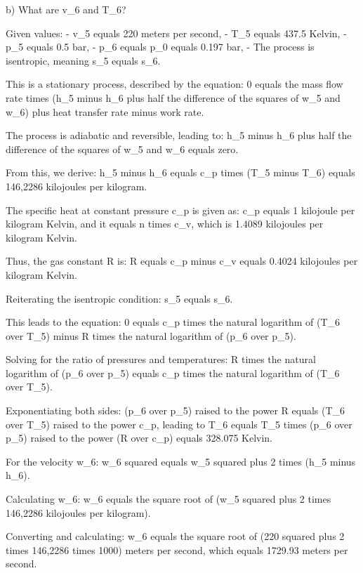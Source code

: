 b) What are v_6 and T_6?

Given values:
- v_5 equals 220 meters per second,
- T_5 equals 437.5 Kelvin,
- p_5 equals 0.5 bar,
- p_6 equals p_0 equals 0.197 bar,
- The process is isentropic, meaning s_5 equals s_6.

This is a stationary process, described by the equation:
0 equals the mass flow rate times (h_5 minus h_6 plus half the difference of the squares of w_5 and w_6) plus heat transfer rate minus work rate.

The process is adiabatic and reversible, leading to:
h_5 minus h_6 plus half the difference of the squares of w_5 and w_6 equals zero.

From this, we derive:
h_5 minus h_6 equals c_p times (T_5 minus T_6) equals 146,2286 kilojoules per kilogram.

The specific heat at constant pressure c_p is given as:
c_p equals 1 kilojoule per kilogram Kelvin, and it equals n times c_v, which is 1.4089 kilojoules per kilogram Kelvin.

Thus, the gas constant R is:
R equals c_p minus c_v equals 0.4024 kilojoules per kilogram Kelvin.

Reiterating the isentropic condition:
s_5 equals s_6.

This leads to the equation:
0 equals c_p times the natural logarithm of (T_6 over T_5) minus R times the natural logarithm of (p_6 over p_5).

Solving for the ratio of pressures and temperatures:
R times the natural logarithm of (p_6 over p_5) equals c_p times the natural logarithm of (T_6 over T_5).

Exponentiating both sides:
(p_6 over p_5) raised to the power R equals (T_6 over T_5) raised to the power c_p, leading to T_6 equals T_5 times (p_6 over p_5) raised to the power (R over c_p) equals 328.075 Kelvin.

For the velocity w_6:
w_6 squared equals w_5 squared plus 2 times (h_5 minus h_6).

Calculating w_6:
w_6 equals the square root of (w_5 squared plus 2 times 146,2286 kilojoules per kilogram).

Converting and calculating:
w_6 equals the square root of (220 squared plus 2 times 146,2286 times 1000) meters per second,
which equals 1729.93 meters per second.